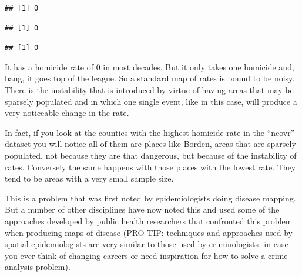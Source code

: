 \documentclass[
]{book}
\makeatletter
\newenvironment{Shaded}{\begin{snugshade}}{\end{snugshade}}
\newcommand{\NormalTok}[1]{#1}
\newcommand{\SpecialCharTok}[1]{\textcolor[rgb]{0,0,0}{#1}}
\newenvironment{kframe}{%
\medskip{}
\setlength{\fboxsep}{.8em}
 \def\at@end@of@kframe{}%
 \ifinner\ifhmode%
  \def\at@end@of@kframe{\end{minipage}}%
  \begin{minipage}{\columnwidth}%
 \fi\fi%
 \def\FrameCommand##1{\hskip\@totalleftmargin \hskip-\fboxsep
 \colorbox{shadecolor}{##1}\hskip-\fboxsep
     \hskip-\linewidth \hskip-\@totalleftmargin \hskip\columnwidth}%
 \MakeFramed {\advance\hsize-\width
   \@totalleftmargin\z@ \linewidth\hsize
   \@setminipage}}%
 {\par\unskip\endMakeFramed%
 \at@end@of@kframe}
\renewenvironment{Shaded}{\begin{kframe}}{\end{kframe}}
\makeatother
\begin{document}
\begin{verbatim}
## [1] 0
\end{verbatim}

\begin{Shaded}
\end{Shaded}

\begin{verbatim}
## [1] 0
\end{verbatim}

\begin{Shaded}
\end{Shaded}

\begin{verbatim}
## [1] 0
\end{verbatim}

It has a homicide rate of 0 in most decades. But it only takes one homicide and, bang, it goes top of the league. So a standard map of rates is bound to be noisy. There is the instability that is introduced by virtue of having areas that may be sparsely populated and in which one single event, like in this case, will produce a very noticeable change in the rate.

In fact, if you look at the counties with the highest homicide rate in the ``ncovr'' dataset you will notice all of them are places like Borden, areas that are sparsely populated, not because they are that dangerous, but because of the instability of rates. Conversely the same happens with those places with the lowest rate. They tend to be areas with a very small sample size.

This is a problem that was first noted by epidemiologists doing disease mapping. But a number of other disciplines have now noted this and used some of the approaches developed by public health researchers that confronted this problem when producing maps of disease (PRO TIP: techniques and approaches used by spatial epidemiologists are very similar to those used by criminologists -in case you ever think of changing careers or need inspiration for how to solve a crime analysis problem).
\end{document}
